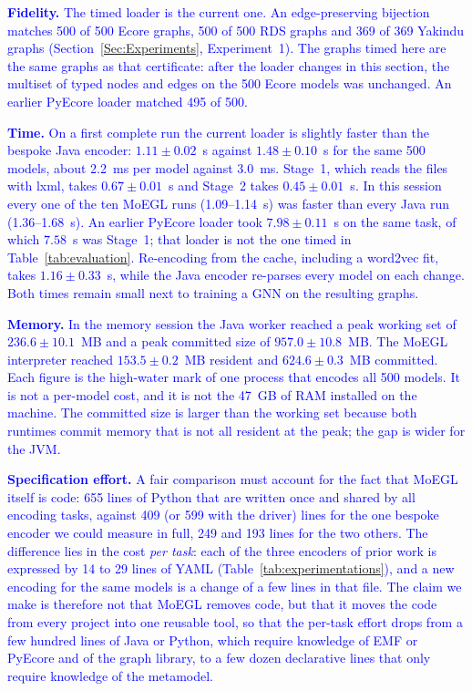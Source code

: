 \documentclass[journal,article,submit,moreauthors,technologies]{Definitions/mdpi}
\newcommand{\rev}[1]{\textcolor{blue}{#1}}
\begin{document}
\rev{\textbf{Fidelity.} The timed loader is the current one. An edge-preserving bijection matches 500 of 500 Ecore graphs, 500 of 500 RDS graphs and 369 of 369 Yakindu graphs (Section~\ref{Sec:Experiments}, Experiment~1). The graphs timed here are the same graphs as that certificate: after the loader changes in this section, the multiset of typed nodes and edges on the 500 Ecore models was unchanged. An earlier PyEcore loader matched 495 of 500.}

\rev{\textbf{Time.} On a first complete run the current loader is slightly faster than the bespoke Java encoder: $1.11 \pm 0.02$~s against $1.48 \pm 0.10$~s for the same 500 models, about 2.2~ms per model against 3.0~ms. Stage~1, which reads the files with lxml, takes $0.67 \pm 0.01$~s and Stage~2 takes $0.45 \pm 0.01$~s. In this session every one of the ten MoEGL runs (1.09--1.14~s) was faster than every Java run (1.36--1.68~s). An earlier PyEcore loader took $7.98 \pm 0.11$~s on the same task, of which $7.58$~s was Stage~1; that loader is not the one timed in Table~\ref{tab:evaluation}. Re-encoding from the cache, including a word2vec fit, takes $1.16 \pm 0.33$~s, while the Java encoder re-parses every model on each change. Both times remain small next to training a GNN on the resulting graphs.}

\rev{\textbf{Memory.} In the memory session the Java worker reached a peak working set of $236.6 \pm 10.1$~MB and a peak committed size of $957.0 \pm 10.8$~MB. The MoEGL interpreter reached $153.5 \pm 0.2$~MB resident and $624.6 \pm 0.3$~MB committed. Each figure is the high-water mark of one process that encodes all 500 models. It is not a per-model cost, and it is not the 47~GB of RAM installed on the machine. The committed size is larger than the working set because both runtimes commit memory that is not all resident at the peak; the gap is wider for the JVM.}

\rev{\textbf{Specification effort.} A fair comparison must account for the fact that MoEGL itself is code: 655 lines of Python that are written once and shared by all encoding tasks, against 409 (or 599 with the driver) lines for the one bespoke encoder we could measure in full, 249 and 193 lines for the two others. The difference lies in the cost \emph{per task}: each of the three encoders of prior work is expressed by 14 to 29 lines of YAML (Table~\ref{tab:experimentations}), and a new encoding for the same models is a change of a few lines in that file. The claim we make is therefore not that MoEGL removes code, but that it moves the code from every project into one reusable tool, so that the per-task effort drops from a few hundred lines of Java or Python, which require knowledge of EMF or PyEcore and of the graph library, to a few dozen declarative lines that only require knowledge of the metamodel.}
\end{document}
